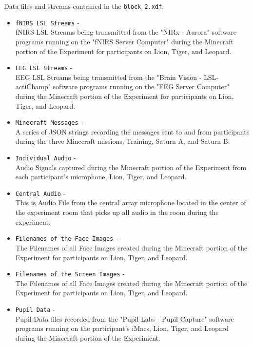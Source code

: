 \begin{description}
\begin{addmargin}[0em]{0em}
    Data files and streams contained in the \verb|block_2.xdf|:
    \begin{itemize}
        \item \verb|fNIRS LSL Streams| -\\fNIRS LSL Streams being transmitted from the "NIRx - Aurora" software programs running on the "fNIRS Server Computer" during the Minecraft portion of the Experiment for participants on Lion, Tiger, and Leopard.
        \item \verb|EEG LSL Streams| -\\EEG LSL Streams being transmitted from the "Brain Vision - LSL-actiChamp" software programs running on the "EEG Server Computer" during the Minecraft portion of the Experiment for participants on Lion, Tiger, and Leopard.
        \item \verb|Minecraft Messages| -\\A series of JSON strings recording the messages sent to and from participants during the three Minecraft missions, Training, Saturn A, and Saturn B.
        \item \verb|Individual Audio| -\\Audio Signals captured during the Minecraft portion of the Experiment from each participant's microphone, Lion, Tiger, and Leopard.
        \item \verb|Central Audio| -\\This is Audio File from the central array microphone located in the center of the experiment room that picks up all audio in the room during the experiment.
        \item \verb|Filenames of the Face Images| -\\The Filenames of all Face Images created during the Minecraft portion of the Experiment for participants on Lion, Tiger, and Leopard.
        \item \verb|Filenames of the Screen Images| -\\The Filenames of all Face Images created during the Minecraft portion of the Experiment for participants on Lion, Tiger, and Leopard.
        \item \verb|Pupil Data| -\\Pupil Data files recorded from the "Pupil Labs - Pupil Capture" software programs running on the participant's iMacs, Lion, Tiger, and Leopard during the Minecraft portion of the Experiment.
    \end{itemize}

\end{addmargin}


\end{description}
